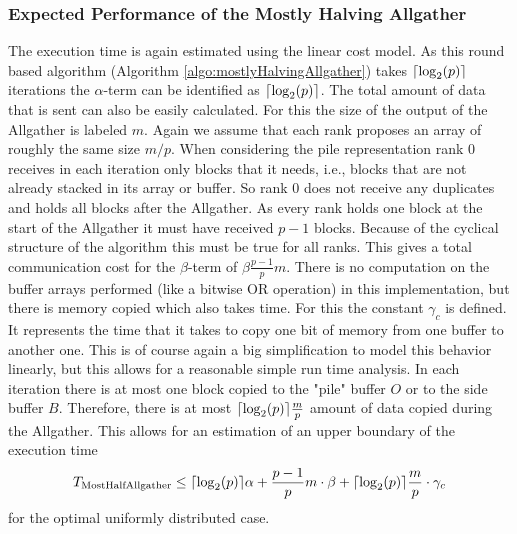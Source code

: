 \subsubsection{Expected Performance of the Mostly Halving Allgather} \label{sec:AllgatherShift Performance}
The execution time is again estimated using the linear cost model. As this round based algorithm (Algorithm \ref{algo:mostlyHalvingAllgather}) takes $\lceil\log_2(p)\rceil$ iterations the  $\alpha$-term can be identified as $\lceil\log_2(p)\rceil$. The total amount of data that is sent can also be easily calculated. For this the size of the output of the Allgather is labeled $m$. Again we assume that each rank proposes an array of roughly the same size $m/p$. When considering the pile representation rank 0 receives in each iteration only blocks that it needs, i.e., blocks that are not already stacked in its array or buffer. So rank 0 does not receive any duplicates and holds all blocks after the Allgather. As every rank holds one block at the start of the Allgather  it must have received $p-1$ blocks. Because of the cyclical structure of the algorithm this must be true for all ranks. This gives a total communication cost for the $\beta$-term of $\beta\frac{p-1}{p}m$. There is no computation on the buffer arrays performed (like a bitwise OR operation) in this implementation, but there is memory copied which also takes time. For this the constant $\gamma_c$ is defined. It represents the time that it takes to copy one bit of memory from one buffer to another one. This is of course again a big simplification to model this behavior linearly, but this allows for a reasonable simple run time analysis. In each iteration there is at most one block copied to the "pile" buffer $O$ or to the side buffer $B$. Therefore, there is at most $\lceil\log_2(p)\rceil \frac{m}{p}$ amount of data copied during the Allgather. This allows for an estimation of an upper boundary of the execution time
\begin{align}
	T_\mathrm{MostHalfAllgather} \leq \lceil\log_2(p)\rceil\alpha
	+ \frac{p-1}{p}m\cdot \beta
	+ \lceil\log_2(p)\rceil \frac{m}{p} \cdot \gamma_c
\end{align} \label{eq:mostlyHalvingAllgatherCost}
for the optimal uniformly distributed case.

